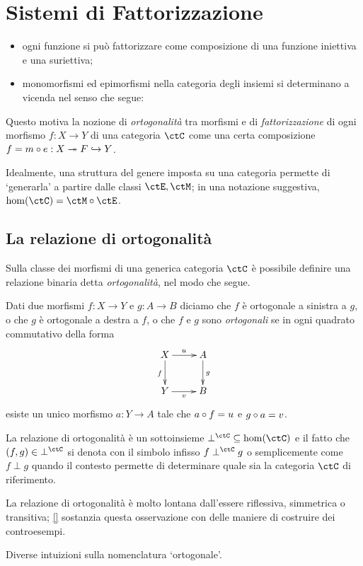 \chapter{Sistemi di Fattorizzazione}
\begin{itemize}
	\item ogni funzione si può fattorizzare come composizione di una funzione iniettiva e una suriettiva;
	\item monomorfismi ed epimorfismi nella categoria degli insiemi si determinano a vicenda nel senso che segue:
\end{itemize}
Questo motiva la nozione di \emph{ortogonalità} tra morfismi e di \emph{fattorizzazione} di ogni morfismo $f : X\to Y$ di una categoria $\ctC$ come una certa composizione $f = m\circ e : X \twoheadrightarrow F \hookrightarrow Y$.

Idealmente, una struttura del genere imposta su una categoria permette di `generarla' a partire dalle classi $\ctE,\ctM$; in una notazione suggestiva, $\hom(\ctC)=\ctM\circ \ctE$.
\section[Ortogonalità]{La relazione di ortogonalità}
Sulla classe dei morfismi di una generica categoria \(\ctC\) è possibile definire una relazione binaria detta \emph{ortogonalità}, nel modo che segue.
\begin{definition}
	Dati due morfismi \(f : X\to Y\) e \(g : A\to B\) diciamo che \(f\) è ortogonale a sinistra a \(g\), o che \(g\) è ortogonale a destra a \(f\), o che \(f\) e \(g\) sono \emph{ortogonali} se in ogni quadrato commutativo della forma
	\[
		\vcenter{\xymatrix{%
				X \ar[r]^u\ar[d]_f & A\ar[d]^g\\
				Y \ar[r]_v & B
			}}\]
	esiste un unico morfismo \(a : Y\to A\) tale che \(a\circ f=u\) e \(g\circ a=v\).
\end{definition}
La relazione di ortogonalità è un sottoinsieme \(\mathbin{\perp^\ctC} \subseteq \hom(\ctC)\) e il fatto che \((f,g)\in \mathbin{\perp^\ctC}\) si denota con il simbolo infisso \(f\perp^\ctC g\) o semplicemente come \(f\perp g\) quando il contesto permette di determinare quale sia la categoria \(\ctC\) di riferimento.

La relazione di ortogonalità è molto lontana dall'essere riflessiva, simmetrica o transitiva; \autoref{} sostanzia questa osservazione con delle maniere di costruire dei controesempi.
\begin{remark}\label{perche_ortogonale}
	Diverse intuizioni sulla nomenclatura `ortogonale'.
\end{remark}

